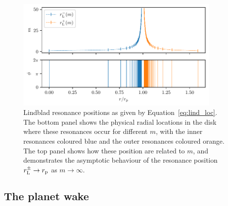 \begin{figure}
    \centering
    \includegraphics[width = 0.9\textwidth]{figures/lindblad_two_panel.pdf}
    \caption{Lindblad resonance positions as given by Equation~\eqref{eq:lind_loc}. The bottom panel shows the physical radial locations in the disk where these resonances occur for different $m$, with the inner resonances coloured blue and the outer resonances coloured orange. The top panel shows how these position are related to $m$, and demonstrates the asymptotic behaviour of the resonance position $r_{\rm L}^\pm \rightarrow r_{\rm p}$ as $m \rightarrow \infty$.}
    \label{fig:lindblad}
\end{figure}

\subsection{The planet wake} \label{sec:planetwake}

